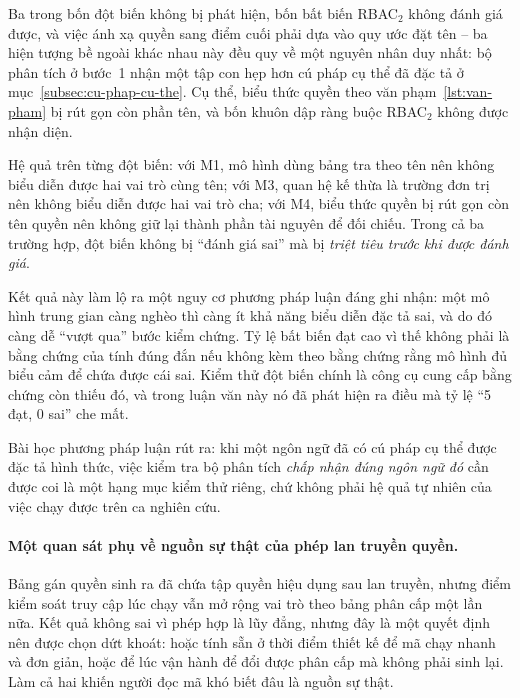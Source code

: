 Ba trong bốn đột biến không bị phát hiện, bốn bất biến RBAC$_2$ không đánh giá được, và việc ánh xạ quyền sang điểm cuối phải dựa vào quy ước đặt tên -- ba hiện tượng bề ngoài khác nhau này đều quy về một nguyên nhân duy nhất: bộ phân tích ở bước~1 nhận một tập con hẹp hơn cú pháp cụ thể đã đặc tả ở mục~\ref{subsec:cu-phap-cu-the}. Cụ thể, biểu thức quyền theo văn phạm~\ref{lst:van-pham} bị rút gọn còn phần tên, và bốn khuôn dập ràng buộc RBAC$_2$ không được nhận diện.

Hệ quả trên từng đột biến: với M1, mô hình dùng bảng tra theo tên nên không biểu diễn được hai vai trò cùng tên; với M3, quan hệ kế thừa là trường đơn trị nên không biểu diễn được hai vai trò cha; với M4, biểu thức quyền bị rút gọn còn tên quyền nên không giữ lại thành phần tài nguyên để đối chiếu. Trong cả ba trường hợp, đột biến không bị ``đánh giá sai'' mà bị \emph{triệt tiêu trước khi được đánh giá}.

\begin{nhanxet}
\label{nx:nghich-ly-dot-bien}
Kết quả này làm lộ ra một nguy cơ phương pháp luận đáng ghi nhận: một mô hình trung gian càng nghèo thì càng ít khả năng biểu diễn đặc tả sai, và do đó càng dễ ``vượt qua'' bước kiểm chứng. Tỷ lệ bất biến đạt cao vì thế không phải là bằng chứng của tính đúng đắn nếu không kèm theo bằng chứng rằng mô hình đủ biểu cảm để chứa được cái sai. Kiểm thử đột biến chính là công cụ cung cấp bằng chứng còn thiếu đó, và trong luận văn này nó đã phát hiện ra điều mà tỷ lệ ``5 đạt, 0 sai'' che mất.
\end{nhanxet}

Bài học phương pháp luận rút ra: khi một ngôn ngữ đã có cú pháp cụ thể được đặc tả hình thức, việc kiểm tra bộ phân tích \emph{chấp nhận đúng ngôn ngữ đó} cần được coi là một hạng mục kiểm thử riêng, chứ không phải hệ quả tự nhiên của việc chạy được trên ca nghiên cứu.

\paragraph{Một quan sát phụ về nguồn sự thật của phép lan truyền quyền.}
Bảng gán quyền sinh ra đã chứa tập quyền hiệu dụng sau lan truyền, nhưng điểm kiểm soát truy cập lúc chạy vẫn mở rộng vai trò theo bảng phân cấp một lần nữa. Kết quả không sai vì phép hợp là lũy đẳng, nhưng đây là một quyết định nên được chọn dứt khoát: hoặc tính sẵn ở thời điểm thiết kế để mã chạy nhanh và đơn giản, hoặc để lúc vận hành để đổi được phân cấp mà không phải sinh lại. Làm cả hai khiến người đọc mã khó biết đâu là nguồn sự thật.


